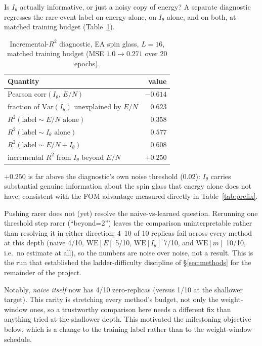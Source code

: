 \documentclass[a4paper,fleqn]{cas-sc}
\begin{document}
Is $I_\theta$ actually informative, or just a noisy copy of energy? A separate
diagnostic regresses the rare-event label on energy alone, on $I_\theta$ alone, and on
both, at matched training budget (Table~\ref{tab:diagnostic}).

\begin{table}[H]
\centering\small
\caption{Incremental-$R^2$ diagnostic, EA spin glass, $L=16$, matched training budget
	(MSE $1.0\to0.271$ over 20 epochs).}
\label{tab:diagnostic}
\begin{tabular}{lr}
	\toprule
	Quantity & value \\
	\midrule
	Pearson corr$(I_\theta,\,E/N)$ & $-0.614$ \\
	fraction of $\mathrm{Var}(I_\theta)$ unexplained by $E/N$ & $0.623$ \\
	$R^2(\text{label}\sim E/N\text{ alone})$ & $0.358$ \\
	$R^2(\text{label}\sim I_\theta\text{ alone})$ & $0.577$ \\
	$R^2(\text{label}\sim E/N+I_\theta)$ & $0.608$ \\
	incremental $R^2$ from $I_\theta$ beyond $E/N$ & $+0.250$ \\
	\bottomrule
\end{tabular}
\end{table}

$+0.250$ is far above the diagnostic's own noise threshold ($0.02$): $I_\theta$ carries
substantial genuine information about the spin glass that energy alone does not have,
consistent with the FOM advantage measured directly in Table~\ref{tab:prefix}.

Pushing rarer does not (yet) resolve the naive-vs-learned question. Rerunning one
threshold step rarer (``beyond=2'') leaves the comparison uninterpretable rather than
resolving it in either direction: 4--10 of 10 replicas fail across every method at this
depth (naive 4/10, $\mathrm{WE}[E]$ 5/10, $\mathrm{WE}[I_\theta]$ 7/10, and
$\mathrm{WE}[m]$ 10/10, i.e.\ no estimate at all), so the numbers are noise over noise,
not a result. This
is the run that established the ladder-difficulty discipline of \S\ref{sec:methods} for the
remainder of the project.

Notably, \emph{naive itself} now has 4/10 zero-replicas (versus 1/10 at the shallower
target). This rarity is stretching every method's budget, not only the weight-window
ones, so a trustworthy comparison here needs a different fix than anything tried at the
shallower depth. This motivated the milestoning objective below, which is a change to the
training label rather than to the weight-window schedule.
\end{document}
